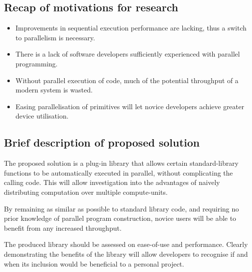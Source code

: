 \subsection{Recap of motivations for research}
\begin{itemize}
\item Improvements in sequential execution performance are lacking, thus a switch to parallelism is necessary.

\item There is a lack of software developers sufficiently experienced with parallel programming.

\item Without parallel execution of code, much of the potential throughput of a modern system is wasted.

\item Easing parallelisation of primitives will let novice developers achieve greater device utilisation.
\end{itemize}

\subsection{Brief description of proposed solution}
The proposed solution is a plug-in library that allows certain standard-library functions to be automatically executed in parallel, without complicating the calling code.
This will allow investigation into the advantages of naively distributing computation over multiple compute-units.

By remaining as similar as possible to standard library code, and requiring no prior knowledge of parallel program construction, novice users will be able to benefit from any increased throughput.

The produced library should be assessed on ease-of-use and performance. Clearly demonstrating the benefits of the library will allow developers to recognise if and when its inclusion would be beneficial to a personal project.

